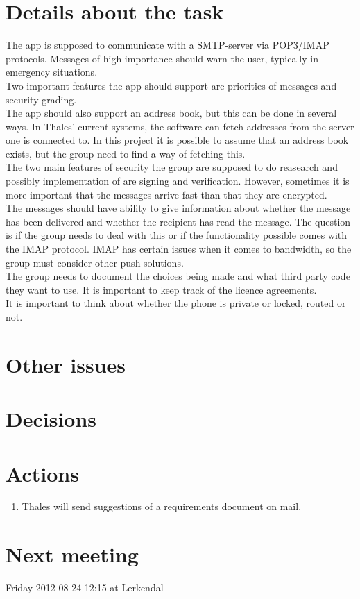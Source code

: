 \documentclass[a4paper,12pt]{article}
\begin{document}
\section{Details about the task}
The app is supposed to communicate with a SMTP-server via POP3/IMAP protocols. Messages of high importance should warn the user, typically in emergency situations.\\
Two important features the app should support are priorities of messages and security grading.\\
The app should also support an address book, but this can be done in several ways. In Thales' current systems, the software can fetch addresses from the server one is connected to. In this project it is possible to assume that an address book exists, but the group need to find a way of fetching this.\\
The two main features of security the group are supposed to do reasearch and possibly implementation of are signing and verification. However, sometimes it is more important that the messages arrive fast than that they are encrypted.\\
The messages should have ability to give information about whether the message has been delivered and whether the recipient has read the message. The question is if the group needs to deal with this or if the functionality possible comes with the IMAP protocol. IMAP has certain issues when it comes to bandwidth, so the group must consider other push solutions. \\
The group needs to document the choices being made and what third party code they want to use. It is important to keep track of the licence agreements.\\
It is important to think about whether the phone is private or locked, routed or not.
\section{Other issues}
\section{Decisions}
\section{Actions}
\begin{enumerate}
\item
Thales will send suggestions of a requirements document on mail.
\end{enumerate}
\section{Next meeting}
Friday 2012-08-24 12:15 at Lerkendal
\end{document}
